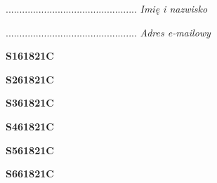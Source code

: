 \begin{turn}{90}\begin{minipage}{\linewidth} \vspace{20mm} ................................................  \textit{Imię i nazwisko}\end{minipage}\end{turn}

\begin{turn}{90}\begin{minipage}{\linewidth} \vspace{20mm} ................................................  \textit{Adres e-mailowy}\end{minipage}\end{turn}

\begin{turn}{90}\huge \begin{minipage}{\linewidth} \vspace{10mm}\textbf{S161821C}\end{minipage}\end{turn}

\begin{turn}{90}\huge \begin{minipage}{\linewidth} \vspace{10mm}\textbf{S261821C}\end{minipage}\end{turn}

\begin{turn}{90}\huge \begin{minipage}{\linewidth} \vspace{10mm}\textbf{S361821C}\end{minipage}\end{turn}

\begin{turn}{90}\huge \begin{minipage}{\linewidth} \vspace{10mm}\textbf{S461821C}\end{minipage}\end{turn}

\begin{turn}{90}\huge \begin{minipage}{\linewidth} \vspace{10mm}\textbf{S561821C}\end{minipage}\end{turn}

\begin{turn}{90}\huge \begin{minipage}{\linewidth} \vspace{10mm}\textbf{S661821C}\end{minipage}\end{turn}


